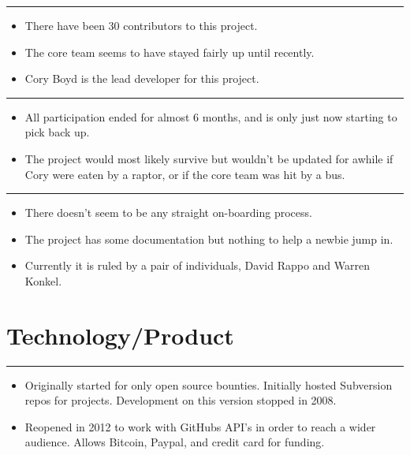 \begin{center}\rule{3in}{0.4pt}\end{center}

\begin{itemize}
\itemsep1pt\parskip0pt
\item
  There have been 30 contributors to this project.
\item
  The core team seems to have stayed fairly up until recently.
\item
  Cory Boyd is the lead developer for this project.
\end{itemize}

\begin{center}\rule{3in}{0.4pt}\end{center}

\begin{itemize}
\itemsep1pt\parskip0pt
\item
  All participation ended for almost 6 months, and is only just now
  starting to pick back up.
\item
  The project would most likely survive but wouldn't be updated for
  awhile if Cory were eaten by a raptor, or if the core team was hit by
  a bus.
\end{itemize}

\begin{center}\rule{3in}{0.4pt}\end{center}

\begin{itemize}
\itemsep1pt\parskip0pt
\item
  There doesn't seem to be any straight on-boarding process.
\item
  The project has some documentation but nothing to help a newbie jump
  in.
\item
  Currently it is ruled by a pair of individuals, David Rappo and Warren
  Konkel.
\end{itemize}

\section{Technology/Product}\label{technologyproduct}

\begin{center}\rule{3in}{0.4pt}\end{center}

\begin{itemize}
\itemsep1pt\parskip0pt
\item
  Originally started for only open source bounties. Initially hosted
  Subversion repos for projects. Development on this version stopped in
  2008.
\item
  Reopened in 2012 to work with GitHubs API's in order to reach a wider
  audience. Allows Bitcoin, Paypal, and credit card for funding.
\end{itemize}
